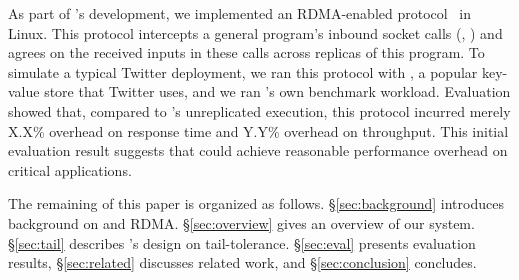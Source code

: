As part of \xxx's development, we implemented an RDMA-enabled \paxos 
protocol~\cite{falcon:github} in Linux. This protocol intercepts a general 
program's inbound socket calls (\eg, \recv) and agrees on the received inputs 
in these calls across replicas of this program. To simulate a typical Twitter 
deployment, we ran this protocol with \redis, a popular key-value store that 
Twitter uses, and we ran \redis's own benchmark workload. Evaluation showed 
that, compared to \redis's unreplicated execution, this protocol incurred 
merely X.X\% overhead on response time and Y.Y\% overhead on throughput. This 
initial evaluation result suggests that \xxx could achieve reasonable 
performance overhead on critical applications.


The remaining of this paper is organized as follows. \S\ref{sec:background} 
introduces background on \paxos and RDMA. \S\ref{sec:overview} gives an 
overview of our \xxx system. \S\ref{sec:tail} describes \xxx's design on 
tail-tolerance. \S\ref{sec:eval} presents evaluation results, 
\S\ref{sec:related} discusses related work, and \S\ref{sec:conclusion} 
concludes.   


